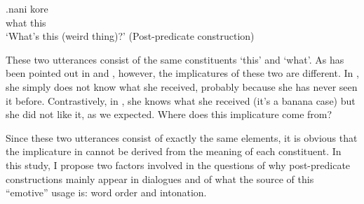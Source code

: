 \exg.\label{nanikore}nani kore \\
	what this \\
	`What's this (weird thing)?'
	\hfill{(Post-predicate construction)}

These two utterances consist of the same constituents  `this' and  `what'.
As has been pointed out in  and ,
however, the implicatures of these two are different.
In \LLast,
she simply does not know what she received,
probably because she has never seen it before.
Contrastively, in \Last,
she knows what she received (it's a banana case) but she did not like it, as we expected.
Where does this implicature come from?

Since these two utterances consist of exactly the same elements,
it is obvious that the implicature in \Last cannot be derived from the meaning of each constituent.
In this study, I propose two factors involved in the questions of why post-predicate constructions mainly appear in dialogues and of what the source of this ``emotive'' usage is:
word order and intonation.

